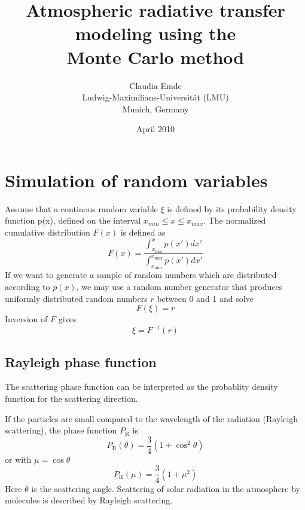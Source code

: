 \documentclass[12pt,twoside,a4paper]{article}
\begin{document}


\title{Atmospheric radiative transfer modeling using the \\Monte Carlo method}
\author{Claudia Emde\\
  Ludwig-Maximilians-Universit{\"a}t (LMU) \\
  Munich, Germany}

\date{April 2010}

\maketitle
                                
\pagestyle{headings}

\newpage 

\tableofcontents

\cleardoublepage
\section{Simulation of random variables} 
\label{sec:random_numbers}

Assume that a continous random variable $\xi$ is defined by its probability 
density function p(x), defined on the interval $x_{min} \le x \le
x_{max}$. The normalized cumulative distribution $F(x)$ is defined as 
\begin{equation}
  F(x)=\frac{\int_{x_\mathrm{min}}^{x} p(x') dx'}{\int_{x_\mathrm{min}}^{x_\mathrm{max}} p(x') dx'}
\end{equation}
If we want to generate a sample of random numbers which are
distributed according to $p(x)$, we may use a random number generator
that produces uniformly distributed random numbers $r$
between 0 and 1 and solve 
\begin{equation}
  F(\xi)=r
\end{equation}
Inversion of $F$ gives
\begin{equation}
  \xi=F^{-1}(r)
\end{equation}

\subsection{Rayleigh phase function}

The scattering phase function can be interpreted as the probablity
density function for the scattering direction. 
 
If the particles are small compared to the wavelength of the
radiation (Rayleigh scattering), the phase function $P_\mathrm{R}$ is 
\begin{equation}
  P_\mathrm{R}(\theta) = \frac{3}{4}(1+\cos^2\theta)
\end{equation}
or with $\mu=\cos\theta$
\begin{equation}
  P_\mathrm{R}(\mu) = \frac{3}{4}(1+\mu^2)
\end{equation}
Here $\theta$ is the scattering angle. 
Scattering of solar radiation in the atmosphere by molecules is
described by Rayleigh scattering.
\end{document}
